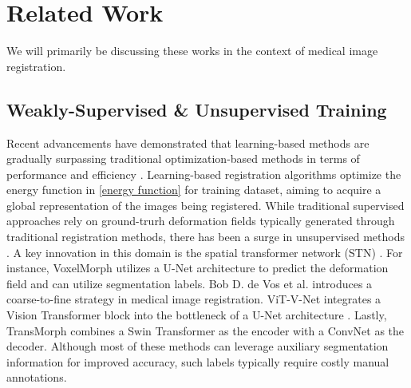 \documentclass[10pt,twocolumn,letterpaper]{article}
\begin{document}
\section{Related Work}
\label{sec:formatting}

We will primarily be discussing these works in the context of medical image registration. 











\subsection{Weakly-Supervised \& Unsupervised Training}

Recent advancements have demonstrated that learning-based methods are gradually surpassing traditional optimization-based methods \cite{10.1007/978-3-540-30135-6_78, john2000voxel, patch-based, GLOCKER2008731, THIRION1998243, lddmm, Beg2005comp} in terms of performance and efficiency \cite{Lea2022IEEE, Aco2018arX, ale2021CoRR, are2022Fro}. Learning-based registration algorithms \cite{Balakrishnan_2019, dalc2018unsp, amen2018unsu, mok2020large, mok2021fast, mok2022affine, jing2021end, shi2022xmor, shen2019netw, shen2019regi, 10.1007/978-3-319-66182-7_27, yang2017quicksilver, 10.1007/978-3-319-66182-7_31} optimize the energy function in \cref{energy function} for training dataset, aiming to acquire a global representation of the images being registered. 
While traditional supervised approaches \cite{yang2017quicksilver, 10.1007/978-3-319-66182-7_27} rely on ground-trurh deformation fields typically generated through traditional registration methods,
there has been a surge in unsupervised methods \cite{Balakrishnan_2019, de_Vos_2019, shen2019netw, zhang2021lear, chen2021vitvnet, Chen_2022}. A key innovation in this domain is the spatial transformer network (STN) \cite{STN}. For instance,
VoxelMorph \cite{Balakrishnan_2019} utilizes a U-Net architecture to predict the deformation field and can utilize segmentation labels. 
Bob D. de Vos et al. \cite{de_Vos_2019} introduces a coarse-to-fine strategy in medical image registration.
ViT-V-Net \cite{chen2021vitvnet} integrates a Vision Transformer \cite{dosovitskiy2021image} block into the bottleneck of a U-Net architecture \cite{isola2018imagetoimage}. 
Lastly, TransMorph \cite{Chen_2022} combines a Swin Transformer \cite{liu2021swin} as the encoder with a ConvNet as the decoder.
Although most of these methods can leverage auxiliary segmentation information for improved accuracy\cite{Balakrishnan_2019}, such labels typically require costly manual annotations.
\end{document}
